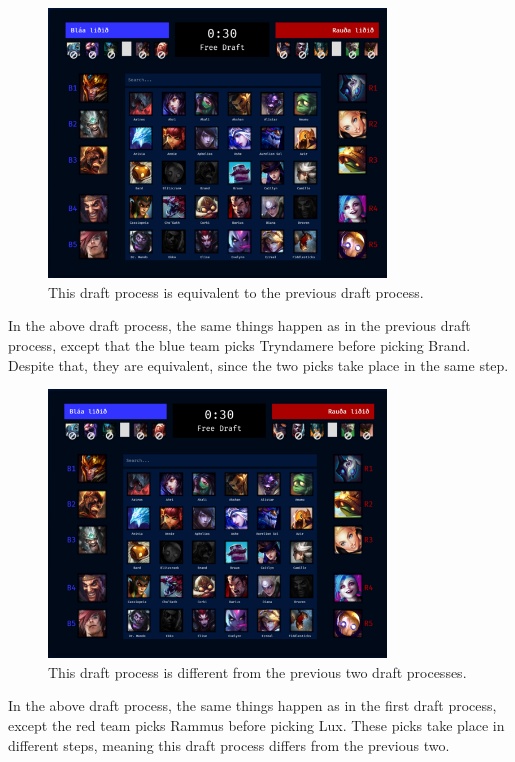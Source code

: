 \begin{figure}[h!]
  \centering
    \includegraphics[width=0.8\textwidth]{equivalent_draft.png}
  \caption{This draft process is equivalent to the previous draft process.}
\end{figure}

In the above draft process, the same things happen as in the previous draft process, except that the blue team picks Tryndamere before picking Brand.
Despite that, they are equivalent, since the two picks take place in the same step.

\begin{figure}[h!]
  \centering
    \includegraphics[width=0.8\textwidth]{different_draft.png}
  \caption{This draft process is different from the previous two draft processes.}
\end{figure}

In the above draft process, the same things happen as in the first draft process, except the red team picks Rammus before picking Lux.
These picks take place in different steps, meaning this draft process differs from the previous two.

